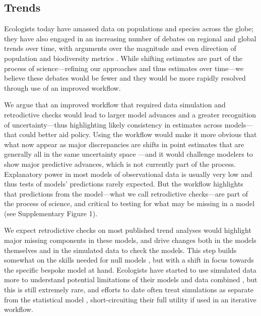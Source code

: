 \documentclass[11pt]{article}
\newcommand{\llabel}[1]{\hypertarget{lintarget:#1}{}\linelabel{lin:#1}}
\begin{document}
\subsection{Trends}

Ecologists today have amassed data on populations and species across the globe; they have also engaged in an increasing number of debates on regional and global trends over time, with arguments over the magnitude and even direction of population and biodiversity metrics \citep{Dornelas2014,Leung2020,terry2022no,muller2024weather}. While shifting estimates are part of the process of science---refining our approaches and thus estimates over time---we believe these debates would be fewer and they would be more rapidly resolved through use of an improved workflow. %

We argue that an improved workflow that required data simulation and retrodictive checks would lead to larger model advances and a greater recognition of uncertainty---thus highlighting likely consistency in estimates across models---that could better aid policy.  Using the workflow would make it more obvious that what now appear as major discrepancies are shifts in point estimates that are generally all in the same uncertainty space \citep{Johnson2024}---and it would challenge modelers to show major predictive advances, which is not currently part of the process. Explanatory power in most models of observational data is usually very low \citep{low2014rising,moller2002much} and thus tests of models' predictions rarely expected. But the workflow highlights that predictions from the model---what we call retrodictive checks---are part of the process of science, and critical to testing for what may be missing in a model \llabel{suppfig3}(see Supplementary Figure 1). 

We expect retrodictive checks on most published trend analyses would highlight major missing components in these models, and drive changes both in the models themselves and in the simulated data to check the models. This step builds somewhat on the skills needed for null models \citep{Gotelli:2012oz}, but with a shift in focus towards the specific bespoke model at hand. Ecologists have started to use simulated data more to understand potential limitations of their models and data combined \citep{Hilborn1997}, but this is still extremely rare, and efforts to date often treat simulations as separate from the statistical model \citep{Buschke2021,dove2023quantifying}, short-circuiting their full utility if used in an iterative workflow.
\end{document}
